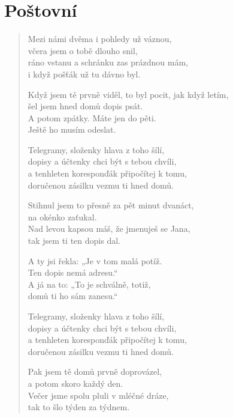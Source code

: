 \section{Poštovní}

\thispagestyle{empty}

\begin{multicols}{2}

\begin{verse}

Mezi námi dvěma i pohledy už váznou,\\
včera jsem o tobě dlouho snil,\\
ráno vstanu a schránku zas prázdnou mám,\\
i když pošťák už tu dávno byl.

Když jsem tě prvně viděl, to byl pocit, jak když letím,\\
šel jsem hned domů dopis psát.\\
A potom zpátky. Máte jen do pěti.\\
Ještě ho musím odeslat.

Telegramy, složenky hlava z toho šílí,\\
dopisy a účtenky chci být s tebou chvíli,\\
a tenhleten koresponďák připočítej k tomu,\\
doručenou zásilku vezmu ti hned domů.

Stihnul jsem to přesně za pět minut dvanáct,\\
na okénko zaťukal.\\
Nad levou kapsou máš, že jmenuješ se Jana,\\
tak jsem ti ten dopis dal.

A ty jsi řekla: „Je v tom malá potíž. \\
Ten dopis nemá adresu.“\\
A já na to: „To je schválně, totiž,\\
domů ti ho sám zanesu.“

Telegramy, složenky hlava z toho šílí,\\
dopisy a účtenky chci být s tebou chvíli,\\
a tenhleten koresponďák připočítej k tomu,\\
doručenou zásilku vezmu ti hned domů.

\columnbreak

Pak jsem tě domů prvně doprovázel,\\
a potom skoro každý den.\\
Večer jsme spolu pluli v mléčné dráze,\\
tak to šlo týden za týdnem.


\end{verse}
\end{multicols}
